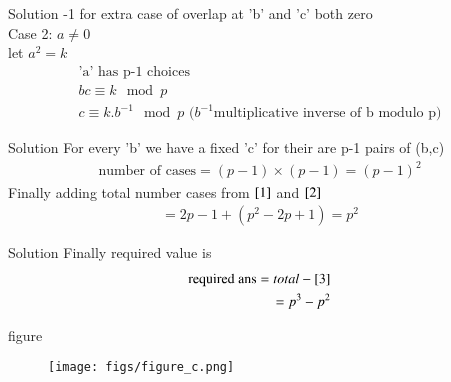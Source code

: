 \documentclass{beamer}
\begin{document}
\begin{frame}{Solution}
-1 for extra case of overlap at 'b' and 'c' both zero\\
Case 2: $a\neq0$\\
let $a^2=k$
\begin{align}
    \text{'a' has p-1 choices}\\
    bc \equiv k \mod p\\
    c\equiv k.b^{-1} \mod p \text{ ($b^{-1}$multiplicative inverse of b modulo p)}
\end{align}
\end{frame}
\begin{frame}{Solution}
For every 'b' we have a fixed 'c' for their are p-1 pairs of (b,c)
\begin{align}
    \text{number of cases}= (p-1)\times(p-1)=(p-1)^2 \label{2}
\end{align}
Finally adding total number cases from $\eqref{1}$ and $\eqref{2}$
\begin{align}
    =2p-1+(p^2-2p+1)
    =p^2 \label{3}
\end{align}
\end{frame}
\begin{frame}{Solution}
Finally required value is
\begin{align}
    \text{required ans}=total - \eqref{3}\\
    = p^3-p^2
\end{align}
\end{frame}
\begin{frame}{figure}
    \begin{figure}[H]
    \centering
    \texttt{[image: figs/figure\_c.png]}
    \caption{}
    \label{fig:placeholder}
\end{figure}
\end{frame}
\end{document}
